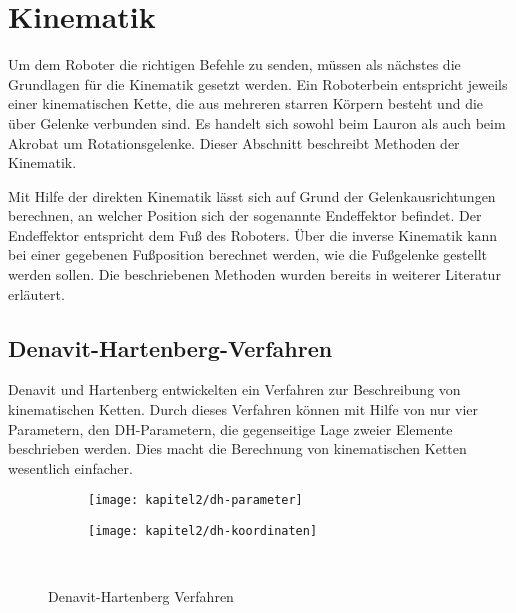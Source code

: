 \section{Kinematik}

Um dem Roboter die richtigen Befehle zu senden, müssen als nächstes die Grundlagen für die Kinematik gesetzt werden. Ein Roboterbein entspricht jeweils einer kinematischen Kette, die aus mehreren starren Körpern besteht und die über Gelenke verbunden sind. Es handelt sich sowohl beim Lauron als auch beim Akrobat um Rotationsgelenke. Dieser Abschnitt beschreibt Methoden der Kinematik.

Mit Hilfe der direkten Kinematik lässt sich auf Grund der Gelenkausrichtungen berechnen, an welcher Position sich der sogenannte Endeffektor befindet. Der Endeffektor entspricht dem Fuß des Roboters. Über die inverse Kinematik kann bei einer gegebenen Fußposition berechnet werden, wie die Fußgelenke gestellt werden sollen. Die beschriebenen Methoden wurden bereits in weiterer Literatur erläutert. \autocite{den55} \autocite{wloka92} \autocite{ihme02} \autocite{fellmann2007}

\subsection{Denavit-Hartenberg-Verfahren}

Denavit und Hartenberg entwickelten ein Verfahren zur Beschreibung von kinematischen Ketten. Durch dieses Verfahren können mit Hilfe von nur vier Parametern, den DH-Parametern, die gegenseitige Lage zweier Elemente beschrieben werden. Dies macht die Berechnung von kinematischen Ketten wesentlich einfacher.

\begin{figure}[b!]
  \centering
  \begin{subfigure}[b]{.4\linewidth}
    \centering
    \texttt{[image: kapitel2/dh-parameter]}
    \label{kap2:dhparams}
  \end{subfigure}%
  \qquad
  \begin{subfigure}[b]{.4\linewidth}
    \centering
    \texttt{[image: kapitel2/dh-koordinaten]}
    \label{kap2:dhcoords}
  \end{subfigure}\\
  \caption{Denavit-Hartenberg Verfahren}
  \label{kap2lauron}
\end{figure}

